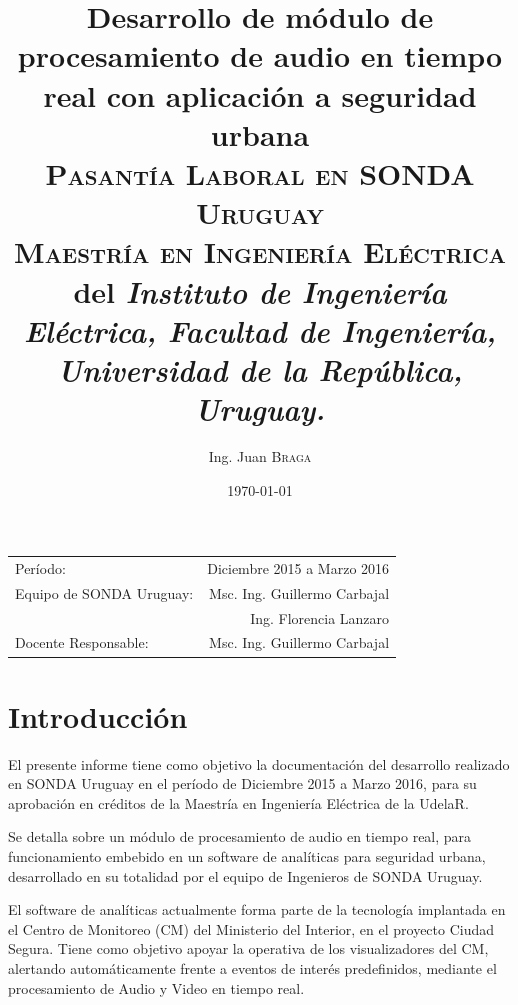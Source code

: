 \documentclass{article}
\title{\textbf{Desarrollo de módulo de procesamiento de audio en tiempo real con aplicación a seguridad urbana}\\ \textsc{Pasantía Laboral en SONDA Uruguay}\\
\large \textsc{Maestría en Ingeniería Eléctrica} del \textit{Instituto de Ingeniería Eléctrica, Facultad de Ingeniería, Universidad de la República, Uruguay.}}
\author{Ing. Juan \textsc{Braga}}
\date{\today} %
\begin{document}
\maketitle %

\begin{center}
\begin{tabular}{l r}
Período: & Diciembre 2015 a Marzo 2016 \\ %
Equipo de SONDA Uruguay: & Msc. Ing. Guillermo Carbajal \\ & Ing. Florencia Lanzaro \\ %

Docente Responsable: & Msc. Ing. Guillermo Carbajal \\ %
\end{tabular}
\end{center}



\section{Introducción}


El presente informe tiene como objetivo la documentación del desarrollo realizado en SONDA Uruguay en el período de Diciembre 2015 a Marzo 2016, para su aprobación en créditos de la Maestría en Ingeniería Eléctrica de la UdelaR. 

Se detalla sobre un módulo de procesamiento de audio en tiempo real, para funcionamiento embebido en un software de analíticas para seguridad urbana, desarrollado en su totalidad por el equipo de Ingenieros de SONDA Uruguay. 

El software de analíticas actualmente forma parte de la tecnología implantada en el Centro de Monitoreo (CM) del Ministerio del Interior, en el proyecto Ciudad Segura. \cite{Crocco:2016:ASS:2891449.2871183} Tiene como objetivo apoyar la operativa de los visualizadores del CM, alertando automáticamente frente a eventos de interés predefinidos, mediante el procesamiento de Audio y Video en tiempo real.  
\end{document}
